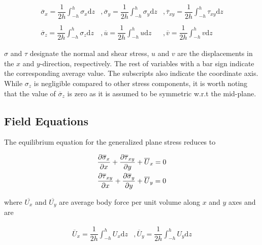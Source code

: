 \documentclass{article}
\begin{document}
\begin{equation}
    \begin{matrix}
    \overline{\sigma}_x = \dfrac{1}{2h} \displaystyle\int_{-h}^{h} \sigma_x \mathrm{d}z & , 
    \overline{\sigma}_y = \dfrac{1}{2h} \displaystyle\int_{-h}^{h} \sigma_y \mathrm{d}z & , 
    \overline{\tau}_{xy} = \dfrac{1}{2h} \displaystyle\int_{-h}^{h} \tau_{xy} \mathrm{d}z \\
    \\
    \overline{\sigma}_z = \dfrac{1}{2h} \displaystyle\int_{-h}^{h} \sigma_z \mathrm{d}z & ,
    \overline{u} = \dfrac{1}{2h} \displaystyle\int_{-h}^{h} u \mathrm{d}z & ,
    \overline{v} = \dfrac{1}{2h} \displaystyle\int_{-h}^{h} v \mathrm{d}z
    \end{matrix}
\end{equation}

$\sigma$ and $\tau$ designate the normal and shear stress, $u$ and $v$ are the displacements in the $x$ and $y$-direction, respectively. The rest of variables with a bar sign indicate the corresponding average value. The subscripts also indicate the coordinate axis. While $\sigma_z$ is negligible compared to other stress components, it is worth noting that the value of $\overline{\sigma}_z$ is zero as it is assumed to be symmetric w.r.t the mid-plane. \\

\subsection{Field Equations}
The equilibrium equation for the generalized plane stress reduces to 

\begin{gather}
    \frac{\partial \overline{\sigma}_x}{\partial x} + \frac{\partial \overline{\tau}_{xy}}{\partial y} + \overline{U}_x = 0 \notag\\
    \frac{\partial \overline{\tau}_{xy}}{\partial x} + \frac{\partial \overline{\sigma}_y}{\partial y} + \overline{U}_y = 0 
    \label{eq:equilibrium_eqn}
\end{gather}

where $\overline{U_x}$ and $\overline{U_y}$ are average body force per unit volume along $x$ and $y$ axes and are 

\begin{equation}
    \begin{matrix}
    \overline{U}_x = \dfrac{1}{2h} \displaystyle\int_{-h}^{h} U_x \mathrm{d}z & , 
    \overline{U}_y = \dfrac{1}{2h} \displaystyle\int_{-h}^{h} U_y \mathrm{d}z
    \end{matrix}
\end{equation}
\end{document}
